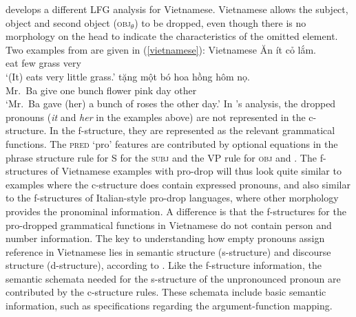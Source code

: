 \documentclass[output=paper,hidelinks]{langscibook}
\begin{document}
  \citet{rosen1998} develops a different LFG analysis for Vietnamese.  Vietnamese allows  the subject, object and second object (\textsc{obj}$_{\theta}$) to be dropped, even though there is no morphology on the head   to indicate the characteristics of the omitted element.  Two examples from  \citet[146]{rosen1998} are given in (\ref{vietnamese}):
  \ea \label{vietnamese}Vietnamese
  \ea    \gll \u{A}n  ít cỏ  l\'{\u{a}}m. \\
eat few grass very  \\ 
 \glt `(It) eats very little grass.'
\ex       {} t\u{\d{a}}ng  m\^{\d{o}}t b\'o hoa hồng h\^om n\d{o}. \\
Mr.~Ba give one bunch flower pink day other  \\ 
 \glt `Mr.~Ba gave (her) a bunch of roses the other day.'
 \z\z
In \citeauthor{rosen1998}'s analysis, the dropped pronouns (\textit{it} and \textit{her} in the examples above) are not represented in the  c-structure. In the f-structure, they are represented as the relevant grammatical functions.  The \textsc{pred} `pro' features are contributed by optional equations in the phrase structure rule for S for the \textsc{subj} and the VP rule for \textsc{obj} and \OBJTHETA.  The f-structures of Vietnamese examples with pro-drop will thus look quite similar to examples where  the c-structure does contain expressed pronouns, and also similar to the f-structures of Italian-style pro-drop languages, where other morphology provides the pronominal information.  A difference is that the f-structures for the pro-dropped grammatical functions in Vietnamese do not contain person and number information.   The key to understanding how empty pronouns  assign reference in Vietnamese lies in semantic structure (s-structure) and discourse structure (d-structure), according to  \citeauthor{rosen1998}. Like the f-structure information, the semantic schemata needed for the s-structure of the unpronounced pronoun are contributed by the c-structure rules. These schemata include basic semantic information, such as  specifications regarding the  argument-function mapping. 
\end{document}
